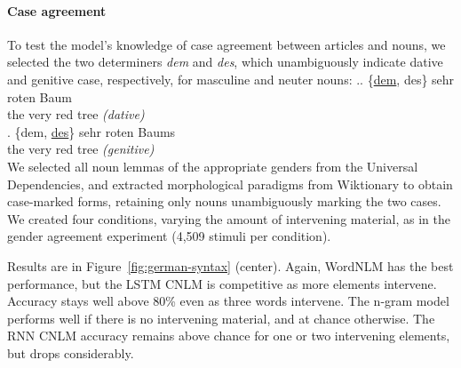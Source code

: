 \paragraph{Case agreement}
To test the model's knowledge of case agreement between articles and
nouns, we selected the two determiners \emph{dem} and \emph{des},
which unambiguously indicate dative and genitive case, respectively,
for masculine and neuter nouns: %
\ex.\ag. {\{\underline{dem}, des\}} sehr roten Baum \\
the very red {tree \emph{(dative)}} \\
\bg. {\{dem, \underline{des}\}} sehr roten Baums \\
the very red {tree \emph{(genitive)}} \\



%

We selected all noun lemmas of the
appropriate genders from the Universal Dependencies, and extracted
morphological paradigms from Wiktionary to obtain case-marked forms,
retaining only nouns unambiguously marking the two cases.  We created
four conditions, varying the amount of intervening material, as in the
gender agreement experiment (4,509 stimuli per condition).

Results are in Figure~\ref{fig:german-syntax} (center).  Again, WordNLM has
the best performance, but the LSTM CNLM is competitive as more
elements intervene. Accuracy stays well above 80\% even as three
words intervene.  The n-gram model performs well if there is no
intervening material, and at chance otherwise.  The RNN
CNLM accuracy remains above chance for one or two intervening elements, but
drops considerably.

